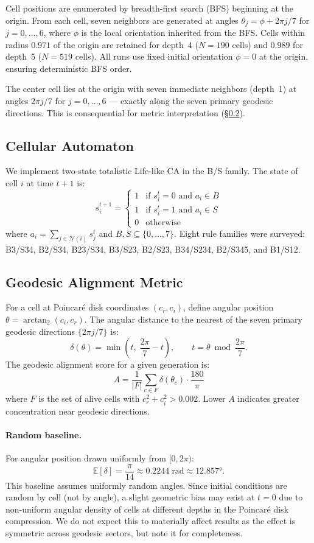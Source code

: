 \documentclass[12pt,a4paper]{article}
\begin{document}
Cell positions are enumerated by breadth-first search (BFS) beginning at the origin. From each cell, seven neighbors are generated at angles $\theta_j=\phi+2\pi j/7$ for $j=0,\ldots,6$, where $\phi$ is the local orientation inherited from the BFS. Cells within radius $0.971$ of the origin are retained for depth~4 ($N=190$ cells) and $0.989$ for depth~5 ($N=519$ cells). All runs use fixed initial orientation $\phi=0$ at the origin, ensuring deterministic BFS order.

The center cell lies at the origin with seven immediate neighbors (depth~1) at angles $2\pi j/7$ for $j=0,\ldots,6$ --- exactly along the seven primary geodesic directions. This is consequential for metric interpretation (\S\ref{sec:metric}).

\subsection{Cellular Automaton}

We implement two-state totalistic Life-like CA in the B/S family. The state of cell $i$ at time $t+1$ is:
\[
  s_i^{t+1} =
  \begin{cases}
    1 & \text{if } s_i^t=0 \text{ and } a_i\in B \\
    1 & \text{if } s_i^t=1 \text{ and } a_i\in S \\
    0 & \text{otherwise}
  \end{cases}
\]
where $a_i=\sum_{j\in\mathcal{N}(i)}s_j^t$ and $B,S\subseteq\{0,\ldots,7\}$. Eight rule families were surveyed: B3/S34, B2/S34, B23/S34, B3/S23, B2/S23, B34/S234, B2/S345, and B1/S12.

\subsection{Geodesic Alignment Metric}
\label{sec:metric}

For a cell at Poincar\'{e} disk coordinates $(c_r,c_i)$, define angular position $\theta=\arctan_2(c_i,c_r)$. The angular distance to the nearest of the seven primary geodesic directions $\{2\pi j/7\}$ is:
\[
  \delta(\theta) = \min\!\left(t,\;\frac{2\pi}{7}-t\right),
  \qquad t = \theta\bmod\frac{2\pi}{7}.
\]
The geodesic alignment score for a given generation is:
\[
  A = \frac{1}{|F|}\sum_{c\in F}\delta(\theta_c)\cdot\frac{180}{\pi}
\]
where $F$ is the set of alive cells with $c_r^2+c_i^2>0.002$. Lower $A$ indicates greater concentration near geodesic directions.

\paragraph{Random baseline.} For angular position drawn uniformly from $[0,2\pi)$:
\[
  \mathbb{E}[\delta] = \frac{\pi}{14} \approx 0.2244\;\text{rad} \approx 12.857°.
\]
This baseline assumes uniformly random angles. Since initial conditions are random by cell (not by angle), a slight geometric bias may exist at $t=0$ due to non-uniform angular density of cells at different depths in the Poincar\'{e} disk compression. We do not expect this to materially affect results as the effect is symmetric across geodesic sectors, but note it for completeness.
\end{document}
